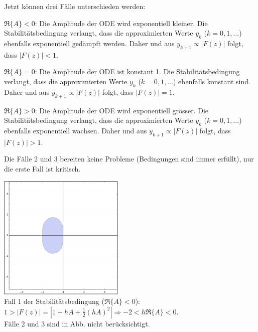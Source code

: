       \begin{minipage}{10cm}
        Jetzt können drei Fälle unterschieden werden:
        \begin{liste}
          \item $\Re\{A\} < 0$: Die Amplitude der ODE wird exponentiell kleiner. Die Stabilitätsbedingung
            verlangt, dass die approximierten Werte $y_k$ ($k=0,1,\ldots$) ebenfalls exponentiell
            gedämpft werden. Daher und aus $y_{k+1} \propto | F(z) |$ folgt, dass $|F(z)| < 1$.
          \item $\Re\{A\} = 0$: Die Amplitude der ODE ist konstant 1. Die Stabilitätsbedingung
            verlangt, dass die approximierten Werte $y_k$ ($k=0,1,\ldots$) ebenfalls konstant sind.
            Daher und aus $y_{k+1} \propto | F(z) |$ folgt, dass $|F(z)| = 1$.
          \item $\Re\{A\} > 0$: Die Amplitude der ODE wird exponentiell grösser. Die Stabilitätsbedingung
            verlangt, dass die approximierten Werte $y_k$ ($k=0,1,\ldots$) ebenfalls exponentiell
            wachsen. Daher und aus $y_{k+1} \propto | F(z) |$ folgt, dass $|F(z)| > 1$.
        \end{liste}

        Die Fälle 2 und 3 bereiten keine Probleme (Bedingungen sind immer erfüllt), nur die erste Fall ist kritisch.
      \end{minipage}
      \hspace{1cm}
      \begin{minipage}{8cm}
        \includegraphics[width=6cm]{./bilder/ode_stability_heun.png}\\
        Fall 1 der Stabilitätsbedingung ($\Re\{A\} < 0$): \\
        $1 > |F(z)| = |1 + hA + \frac12 (hA)^2| \Rightarrow -2 < h \Re\{A\} < 0$.\\
        Fälle 2 und 3 sind in Abb. nicht berücksichtigt.
      \end{minipage}

